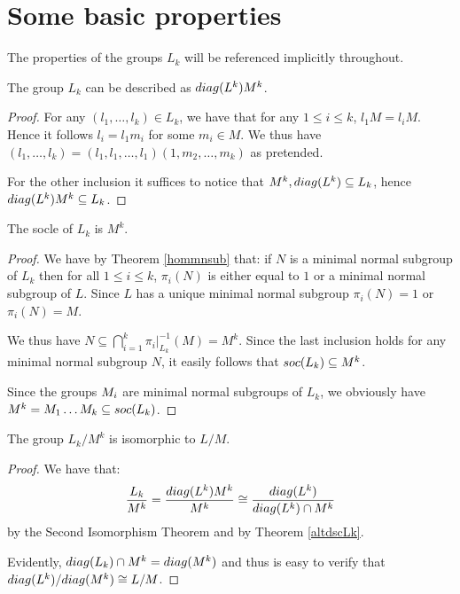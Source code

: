 \section{Some basic properties}
The properties of the groups \(L_k\) will be referenced implicitly throughout.


\begin{theorem}
    \label{altdscLk}
     The group $L_k$ can be described as $\diag{L^{k}}M^{k}$.
\end{theorem}

\begin{proof}
    For any $(l_1,\ldots ,l_k) \in L_k$, we have that for any $1 \le i \le k$, $l_1M = l_iM$. Hence it follows $l_i = l_1m_i$ for some $m_i \in M$. We thus have $(l_1,\ldots ,l_k) = (l_1,l_1,\ldots ,l_1)(1,m_2,\ldots ,m_k)$ as pretended. 
    
    For the other inclusion it suffices to notice that $M^k, \diag{L^k} \subseteq L_k$, hence $\diag{L^k}M^k \subseteq L_k$.
\end{proof}

\begin{theorem}
    The socle of $L_k$ is $M^k$.
\end{theorem}

\begin{proof}
    We have by Theorem \ref{hommnsub} that: if $N$ is a minimal normal subgroup of $L_k$ then for all $1 \le i \le k$, $\pi_i(N)$ is either equal to $1$ or a minimal normal subgroup of $L$. Since $L$ has a unique minimal normal subgroup $\pi_i(N) = 1$ or $\pi_i(N) = M$.
    
    We thus have $N \subseteq \bigcap_{i=1}^{k} \pi_i|_{L_k}^{-1}(M) = M^{k}$. Since the last inclusion holds for any minimal normal subgroup $N$, it easily follows that $\soc{L_k} \subseteq M^k$.

    Since the groups $\Mi$ are minimal normal subgroups of $L_k$, we obviously have $M^k=\Mi[1]\ldots \Mi[k] \subseteq \soc{L_k}$.
\end{proof}

\begin{theorem}
    \label{qtLksoc}
    The group $L_k/M^k$ is isomorphic to $L/M$.
\end{theorem}

\begin{proof}
    We have that:
    $$
        \frac{L_k}{M^k}=\frac{\diag{L^k}M^k}{M^k} \cong \frac{\diag{L^k}}{\diag{L^k} \cap M^k}
    $$
    by the Second Isomorphism Theorem and by Theorem \ref{altdscLk}. 
    
    Evidently, $\diag{L_k} \cap M^k = \diag{M^k}$ and thus is easy to verify that $\diag{L^k}/\diag{M^k} \cong L/M$.
\end{proof}

